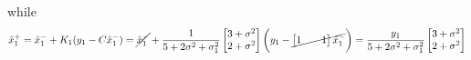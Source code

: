 while
\begin{align*}
    \hat{x}_1^+
    =\hat{x}_1^-+K_1(y_1-C\hat{x}_1^-)
    =\cancel{\hat{x}_1^-}+
    \frac{1}{5+2\sigma^2+\sigma_1^2}
    \begin{bmatrix}
        3+\sigma^2\\2+\sigma^2
    \end{bmatrix}
    \biggl(
        y_1-
        \cancel{
            \begin{bmatrix}
                1&&1
            \end{bmatrix}
            \hat{x}_1^-
        }
    \biggr)
    =\frac{y_1}{5+2\sigma^2+\sigma_1^2}
    \begin{bmatrix}
        3+\sigma^2\\2+\sigma^2
    \end{bmatrix}
\end{align*}